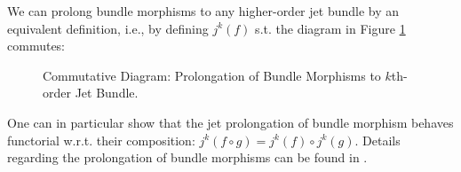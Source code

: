 We can prolong bundle morphisms to any higher-order jet bundle by an equivalent definition, i.e., by defining $j^k(f)$ s.t. the diagram in Figure \ref{POrolongK} commutes:
\begin{figure}[hbt!]
\centering
{}
\caption{Commutative Diagram: Prolongation of Bundle Morphisms to $k$th-order Jet Bundle.} \label{POrolongK}
\end{figure}
One can in particular show that the jet prolongation of bundle morphism behaves functorial w.r.t. their composition: $j^k(f\circ g) = j^k(f) \circ j^k (g)$. Details regarding the prolongation of bundle morphisms can be found in \cite{saunders_1989}.

